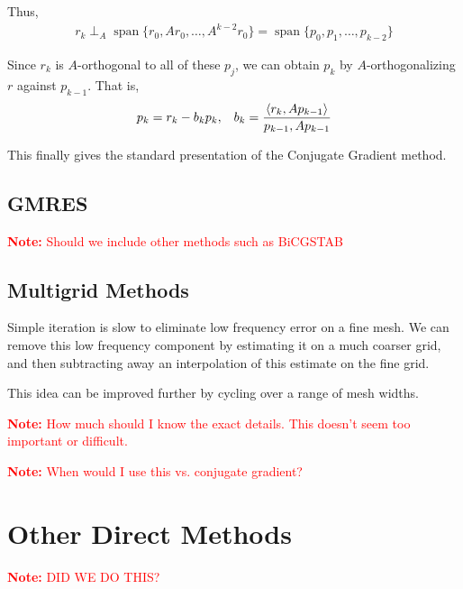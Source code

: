 \documentclass[12pt]{article}
\newcommand{\note}[1]{\textcolor{red}{\textbf{Note:} #1}}
\begin{document}
Thus,
\begin{align*}
    r_k \perp_A \operatorname{span}\{r_0, Ar_0, \ldots, A^{k-2}r_0 \}
    = \operatorname{span}\{ p_0, p_1, \ldots, p_{k-2} \}
\end{align*}

Since \( r_k \) is \( A \)-orthogonal to all of these \( p_j \), we can obtain \( p_{k} \) by \( A \)-orthogonalizing \( r \) against \( p_{k-1} \). That is,
\begin{align*}
    p_k = r_k - b_kp_k, && b_k = \dfrac{\left\langle r_k,Ap_{k-1} \right\rangle}{p_{k-1},Ap_{k-1}}
\end{align*}

This finally gives the standard presentation of the Conjugate Gradient method.
\begin{algorithm}
\begin{algorithmic}
\EndFor
\end{algorithmic}
\end{algorithm}

\subsection{GMRES}

\note{Should we include other methods such as BiCGSTAB}

\subsection{Multigrid Methods}
Simple iteration is slow to eliminate low frequency error on a fine mesh. We can remove this low frequency component by estimating it on a much coarser grid, and then subtracting away an interpolation of this estimate on the fine grid.

This idea can be improved further by cycling over a range of mesh widths.

\note{How much should I know the exact details. This doesn't seem too important or difficult.}

\note{When would I use this vs. conjugate gradient?}


\section{Other Direct Methods}
\note{DID WE DO THIS?}
\end{document}
